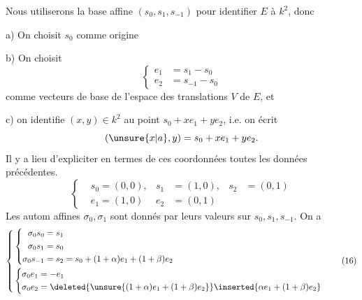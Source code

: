Nous utiliserons  la base affine
$(s_0,s_1,s_{-1})$ pour identifier $E$ à $k^2$, donc

a) On choisit $s_0$ comme origine

b) On choisit
\[ \left\{\begin{aligned}e_1&=s_1-s_0\\
e_2&=s_{-1}-s_0\end{aligned}\right. \tag*{(15)} \]
comme vecteurs de base de l'espace des
translations $V$ de $E$, et

 c) on identifie $(x,y)\in k^2$ au point
$s_0+xe_1+ye_2$, i.e. on écrit
\[ (\unsure{x|a},y)=s_0+xe_1+ye_2. \]
Il y a lieu d'expliciter en termes de ces
coordonnées toutes les données précédentes.
\[ \left\{\begin{aligned} &s_0=(0,0),&s_1&=(1,0),&s_2&=(0,1)\\
&e_1=(1,0)&e_2&=(0,1)\end{aligned}\right. \]
Les autom affines $\sigma_0,\sigma_1$ sont donnés par leurs
valeurs sur $s_0,s_1,s_{-1}$. On a
\[ \left\{\begin{aligned}&\left\{\begin{aligned}\sigma_0s_0&=s_1\\
\sigma_0s_1&=s_0\\
\sigma_0s_{-1}&=s_2=s_0+(1+\alpha)e_1+(1+\beta)e_2\end{aligned}\right.\\
&\left\{\begin{aligned}\sigma_0 e_1&=-e_1\\
\sigma_0 e_2&=\deleted{\unsure{(1+\alpha)e_1+(1+\beta)e_2}}\inserted{\alpha e_1+(1+\beta)e_2}\end{aligned}\right.\end{aligned}\right. \tag*{(16)} \]


\margin{[\,\uline{NB} on s'attend à $\left\{\begin{aligned}\beta&=0\ \text{i.e. }s_2-s_{\unsure{-1|+1}}\parallel e_1\\ \alpha&=\zeta+\zeta^{-1}=2\cos\theta\end{aligned}\right.$\,]}
